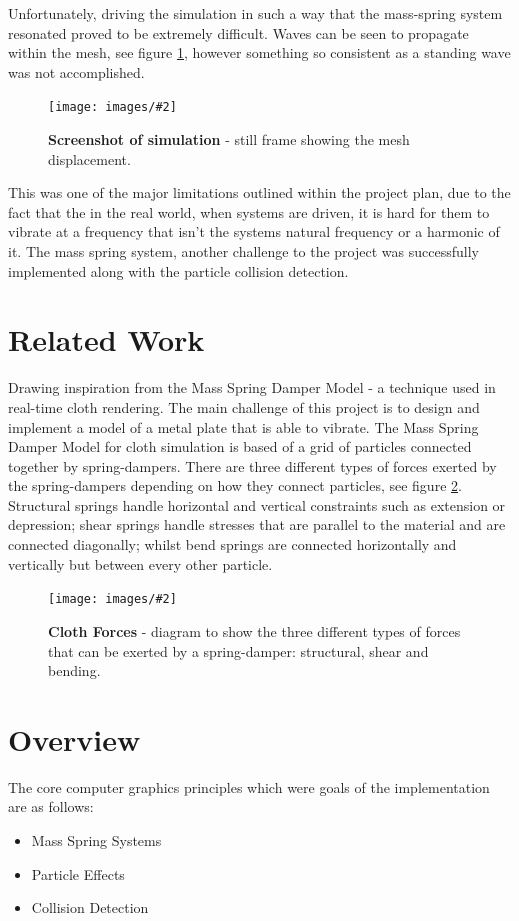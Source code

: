 \documentclass[conference,backref=page]{acmsiggraph}
\newcommand{\figuremacro}[5]{
	\begin{figure}[#1]
		\centering
		\texttt{[image: images/\#2]}
		\caption[#3]{\textbf{#3}#4}
		\label{fig:#2}
	\end{figure}
}
\begin{document}
Unfortunately, driving the simulation in such a way that the mass-spring system resonated proved to be extremely difficult. Waves can be seen to propagate within the mesh, see figure \ref{fig:wave}, however something so consistent as a standing wave was not accomplished. 

\figuremacro{h}{wave}{Screenshot of simulation}{ - still frame showing the mesh displacement.}{1.0}

This was one of the major limitations outlined within the project plan, due to the fact that the in the real world, when systems are driven, it is hard for them to vibrate at a frequency that isn't the systems natural frequency or a harmonic of it. The mass spring system, another challenge to the project was successfully implemented along with the particle collision detection. 

\section{Related Work}

Drawing inspiration from the Mass Spring Damper Model - a technique used in real-time cloth rendering. The main challenge of this project is to design and implement a model of a metal plate that is able to vibrate. The Mass Spring Damper Model for cloth simulation is based of a grid of particles connected together by spring-dampers. There are three different types of forces exerted by the spring-dampers depending on how they connect particles, see figure \ref{fig:cloth}. Structural springs handle horizontal and vertical constraints such as extension or depression; shear springs handle stresses that are parallel to the material and are connected diagonally; whilst bend springs are connected horizontally and vertically but between every other particle. \cite{clothism}

\figuremacro{h}{cloth}{Cloth Forces}{ - diagram to show the three different types of forces that can be exerted by a spring-damper: structural, shear and bending.\cite{clothforce}}{1.0}

\section{Overview}
The core computer graphics principles which were goals of the implementation are as follows:
\begin{itemize}
	\item Mass Spring Systems
	\item Particle Effects
	\item Collision Detection
\end{itemize}
\end{document}
